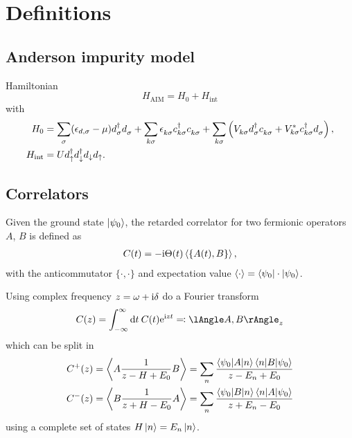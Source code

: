 
\chapter{Definitions}

\section{Anderson impurity model}

Hamiltonian
\begin{equation}
    H_\mathrm{AIM} = H_0 + H_\mathrm{int}
    \label{eq:H_AIM}
\end{equation}
with
\begin{align}
    H_0
     & =
    \sum_{\pk\sigma} (\epsilon_{d,\sigma} - \mu) d^\dag_{\pk\sigma} d^{\pdag}_{\pk\sigma}
    +
    \sum_{k\sigma} \epsilon_{k\sigma}^{\pdag} c^\dag_{k\sigma} c^{\pdag}_{k\sigma}
    +
    \sum_{k\sigma} \left(V^{\ps}_{k\sigma} d^\dag_{\vphantom{k}\sigma} c^{\pdag}_{k\sigma}
    + V_{k\sigma}^* c^\dag_{k\sigma} d^{\pdag}_{\vphantom{k}\sigma} \right),
    \\
    H_\mathrm{int}
     & =
    U d^\dag_\uparrow d^\dag_\downarrow d_\downarrow d_\uparrow.
\end{align}


\section{Correlators}

Given the ground state $\ket{\psi_0}$,
the retarded correlator for two fermionic operators $A$, $B$ is defined as
\begin{align}
    C(t) = -\mathrm{i} \Theta(t) \braket{\{A(t), B\}},
\end{align}
with the anticommutator $\{\cdot,\cdot\}$
and expectation value $\braket{\cdot} = \braket{\psi_0 | \cdot | \psi_0}$.

Using complex frequency $z = \omega + \mathrm{i} \delta$ do a Fourier transform
\begin{equation}
    C(z) = \int_{-\infty}^\infty \md t\>C(t) \me^{\mi zt} \eqqcolon \lAngle A, B \rAngle_z
\end{equation}
which can be split in
\begin{subequations}
    \begin{align}
        C^+(z)
         & =
        \Braket{A \frac{1}{z - H + E_0} B}
        =
        \sum_n \frac{\braket{\psi_0 | A | n}\braket{n | B | \psi_0}}{z - E_n + E_0}
        \\
        C^-(z)
         & =
        \Braket{B \frac{1}{z + H - E_0} A}
        =
        \sum_n \frac{\braket{\psi_0 | B | n}\braket{n | A | \psi_0}}{z + E_n - E_0}
    \end{align}
\end{subequations}
using a complete set of states $H\ket{n} = E_n\ket{n}$.

